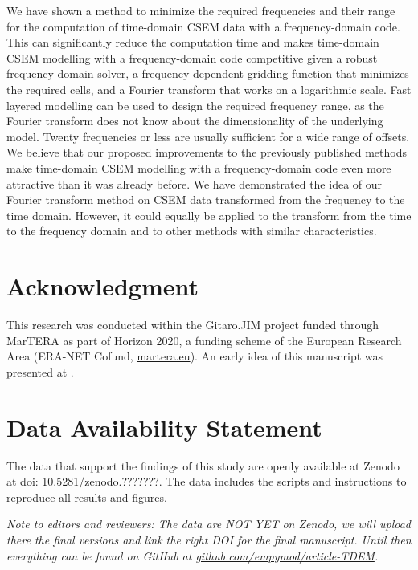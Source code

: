 \documentclass[
    manuscript,
    revised,
  ]{geophysics}
\begin{document}
We have shown a method to minimize the required frequencies and their range for
the computation of time-domain CSEM data with a frequency-domain code. This can
significantly reduce the computation time and makes time-domain CSEM modelling
with a frequency-domain code competitive given a robust frequency-domain
solver, a frequency-dependent gridding function that minimizes the required
cells, and a Fourier transform that works on a logarithmic scale. Fast layered
modelling can be used to design the required frequency range, as the Fourier
transform does not know about the dimensionality of the underlying model.
Twenty frequencies or less are usually sufficient for a wide range of offsets.
We believe that our proposed improvements to the previously published methods
make time-domain CSEM modelling with a frequency-domain code even more
attractive than it was already before. We have demonstrated the idea of our
Fourier transform method on CSEM data transformed from the frequency to the
time domain. However, it could equally be applied to the transform from the
time to the frequency domain and to other methods with similar
characteristics.

\section{Acknowledgment}

This research was conducted within the Gitaro.JIM project funded through
MarTERA as part of Horizon 2020, a funding scheme of the European Research Area
(ERA-NET Cofund, \href{https://www.martera.eu}{martera.eu}).
An early idea of this manuscript was presented at \cite{EAGE.20.Werthmuller}.

\section{Data Availability Statement}

The data that support the findings of this study are openly available at Zenodo
at \href{https://zenodo.org/badge/DOI/10.5281/zenodo.???????}{doi:
10.5281/zenodo.???????}. The data includes the scripts and instructions to
reproduce all results and figures.

\emph{Note to editors and reviewers: The data are NOT YET on Zenodo, we will
  upload there the final versions and link the right DOI for the final
  manuscript. Until then everything can be found on GitHub at
  \href{https://github.com/empymod/article-TDEM}%
  {github.com/empymod/article-TDEM}.}



\end{document}
